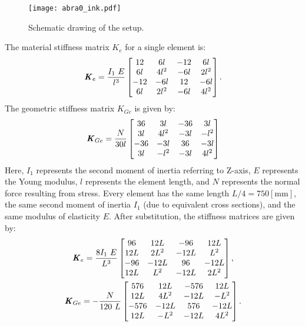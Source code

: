 \documentclass[12pt]{article}
\begin{document}
\begin{figure}[h!]
  \centering
  \texttt{[image: abra0\_ink.pdf]}
  \caption{Schematic drawing of the setup.}
  \label{fig:setup}
\end{figure}
\noindent The material stiffness matrix $K_e$ for a single element is:
\begin{equation}
\textbf{\textit{K}}_e = \dfrac{I_1~E}{l^3}\left[\begin{matrix}12 & 6 l & -12 & 6 l\\6 l &4 l^{2} & - 6 l & 2l^{2}\\-12 & - 6 l & 12 & - 6 l\\6 l & 2l^{2} & - 6 l & 4 l^{2}\end{matrix}\right].
\end{equation}
The geometric stiffness matrix $K_{Ge}$ is given by:
\begin{equation}
\textbf{\textit{K}}_{Ge} = \dfrac{N}{30l} \begin{bmatrix}
36 & 3l & -36 & 3l \\
3l & 4l^2 & -3l & -l^2 \\
-36 & -3l & 36 & -3l \\
3l & -l^2 & -3l & 4l^2 
\end{bmatrix}
\end{equation}
Here, $I_1$ represents the second moment of inertia referring to Z-axis, $E$ represents the Young modulus, $l$ represents the element length, and $N$ represents the normal force resulting from stress. Every element has the same length $L/4 = 750 \left[ \text{mm} \right]$, the same second moment of inertia $I_1$ (due to equivalent cross sections), and the same modulus of elasticity $E$. After substitution, the stiffness matrices are given by:
\begin{gather}
\textbf{\textit{K}}_e = \dfrac{8 I_1~E}{L^3}\left[\begin{matrix}96 & 12 L & -96 & 12 L\\12 L & 2 L^{2} & - 12 L & L^{2}\\-96 & - 12 L & 96 & - 12 L\\12 L & L^{2} & - 12 L & 2 L^{2}\end{matrix}\right], \\
\textbf{\textit{K}}_{Ge} = -\dfrac{N}{120~L}\displaystyle \left[\begin{matrix}576 & 12 L & -576 & 12 L\\12 L & 4 L^{2} & - 12 L & - L^{2}\\-576 & - 12 L & 576 & - 12 L\\12 L & - L^{2} & - 12 L & 4 L^{2}\end{matrix}\right].
\end{gather}
\end{document}
